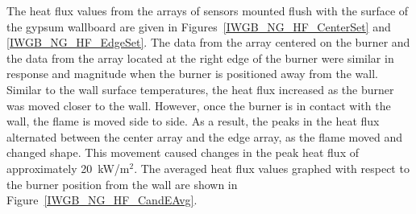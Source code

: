 \documentclass[twoside]{uocthesis}
\begin{document}
{\clearpage

The heat flux values from the arrays of sensors mounted flush with the surface of the gypsum wallboard are given in Figures~\ref{IWGB_NG_HF_CenterSet} and \ref{IWGB_NG_HF_EdgeSet}.  The data from the array centered on the burner and the data from the array located at the right edge of the burner were similar in response and magnitude when the burner is positioned away from the wall.  Similar to the wall surface temperatures, the heat flux increased as the burner was moved closer to the wall.  However, once the burner is in contact with the wall, the flame is moved side to side.  As a result, the peaks in the heat flux alternated between the center array and the edge array, as the flame moved and changed shape.  This movement caused changes in the peak heat flux of approximately 20~kW/m$^2$.  The averaged heat flux values graphed with respect to the burner position from the wall are shown in Figure~\ref{IWGB_NG_HF_CandEAvg}.     

}
\end{document}
